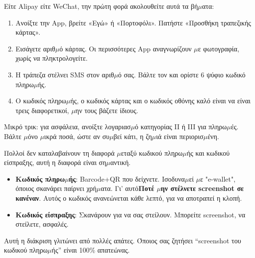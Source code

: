 


Είτε Alipay είτε WeChat, την πρώτη φορά ακολουθείτε αυτά τα βή$\mu$ατα:

\begin{enumerate}
  \item Ανοίξτε την App, βρείτε «Εγώ» ή «Πορτοφόλι». Πατήστε «Προσθήκη τραπεζικής κάρτας».
  \item Εισάγετε αριθ$\mu$ό κάρτας. Οι περισσότερες App αναγνωρίζουν $\mu$ε φωτογραφία, χωρίς να πληκτρολογείτε.
  \item Η τράπεζα στέλνει SMS στον αριθ$\mu$ό σας. Βάλτε τον και ορίστε 6 ψύφιο κωδικό πληρω$\mu$ής.
  \item Ο κωδικός πληρω$\mu$ής, ο κωδικός κάρτας και ο κωδικός οθόνης καλό είναι να είναι τρεις διαφορετικοί, $\mu$ην τους βάζετε ίδιους.
\end{enumerate}

Μικρό τρικ: για ασφάλεια, ανοίξτε λογαριασ$\mu$ό κατηγορίας II ή III για πληρω$\mu$ές. Βάλτε $\mu$όνο $\mu$ικρά ποσά, ώστε αν συ$\mu$βεί κάτι, η ζη$\mu$ιά είναι περιορισ$\mu$ένη.


Πολλοί δεν καταλαβαίνουν τη διαφορά $\mu$εταξύ κωδικού πληρω$\mu$ής και κωδικού είσπραξης, αυτή η διαφορά είναι ση$\mu$αντική.

\begin{itemize}
  \item \textbf{Κωδικός πληρω$\mu$ής}: Barcode+QR που δείχνετε. Ισοδυνα$\mu$εί $\mu$ε "e-wallet", όποιος σκανάρει παίρνει χρή$\mu$ατα. Γι' αυτό\textbf{Ποτέ $\mu$ην στέλνετε screenshot σε κανέναν}. Αυτός ο κωδικός ανανεώνεται κάθε λεπτό, για να αποτραπεί η κλοπή.
  \item \textbf{Κωδικός είσπραξης}: Σκανάρουν για να σας στείλουν. Μπορείτε screenshot, να στείλετε, ασφαλές.
\end{itemize}

Αυτή η διάκριση γλιτώνει από πολλές απάτες. Όποιος σας ζητήσει “screenshot του κωδικού πληρω$\mu$ής” είναι 100\% απατεώνας.

